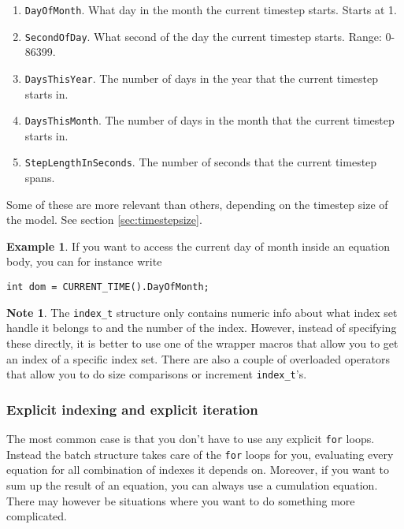 \documentclass[11pt]{article}
\theoremstyle{definition}
\newtheorem{mynote}{Note}
\newenvironment{note}%
  {\begin{lrbox}{\notebox}%
   \begin{minipage}{\dimexpr\linewidth-2\fboxsep}
   \begin{mynote}}%
  {\end{mynote}%
   \end{minipage}%
   \end{lrbox}%
   \begin{trivlist}
     \item[]\colorbox{silver}{\usebox\notebox}
   \end{trivlist}}
\newtheorem{myexample}{Example}
\newenvironment{example}%
  {\begin{lrbox}{\examplebox}%
   \begin{minipage}{\dimexpr\linewidth-2\fboxsep}
   \begin{myexample}}%
  {\end{myexample}%
   \end{minipage}%
   \end{lrbox}%
   \begin{trivlist}
     \item[]\colorbox{silver}{\usebox\examplebox}
   \end{trivlist}}
\begin{document}
\begin{enumerate}[i]
\begin{enumerate}[1]
	\item {\tt DayOfMonth}. What day in the month the current timestep starts. Starts at 1.
	\item {\tt SecondOfDay}. What second of the day the current timestep starts. Range: 0-86399.
	\item {\tt DaysThisYear}. The number of days in the year that the current timestep starts in.
	\item {\tt DaysThisMonth}. The number of days in the month that the current timestep starts in.
	\item {\tt StepLengthInSeconds}. The number of seconds that the current timestep spans.
	\end{enumerate}
Some of these are more relevant than others, depending on the timestep size of the model. See section \ref{sec:timestepsize}.
\end{enumerate}

\begin{example}
If you want to access the current day of month inside an equation body, you can for instance write
\begin{lstlisting}[style=mycpp]
int dom = CURRENT_TIME().DayOfMonth;
\end{lstlisting}
\end{example}

\begin{note}
The {\tt index\_t} structure only contains numeric info about what index set handle it belongs to and the number of the index. However, instead of specifying these directly, it is better to use one of the wrapper macros that allow you to get an index of a specific index set. There are also a couple of overloaded operators that allow you to do size comparisons or increment {\tt index\_t}'s.
\end{note}

\subsubsection{Explicit indexing and explicit iteration}

The most common case is that you don't have to use any explicit {\tt for} loops. Instead the batch structure takes care of the {\tt for} loops for you, evaluating every equation for all combination of indexes it depends on. Moreover, if you want to sum up the result of an equation, you can always use a cumulation equation. There may however be situations where you want to do something more complicated.
\end{document}
